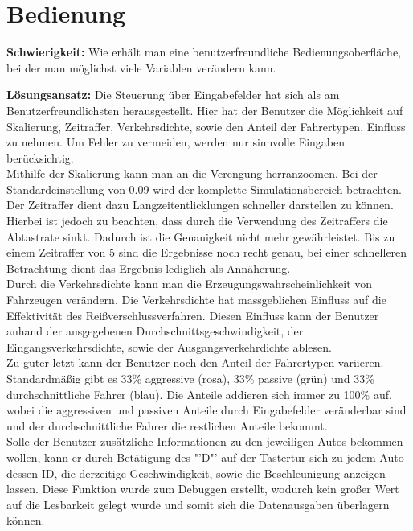 \section{Bedienung}
\textbf{Schwierigkeit:} Wie erhält man eine benutzerfreundliche Bedienungsoberfläche, bei der man möglichst viele Variablen verändern kann.
\begin{addmargin}[25pt]{0pt}
	\item \textbf{Lösungsansatz:} Die Steuerung über Eingabefelder hat sich als am Benutzerfreundlichsten herausgestellt. Hier hat der Benutzer die Möglichkeit auf Skalierung, Zeitraffer, Verkehrsdichte, sowie den Anteil der Fahrertypen, Einfluss zu nehmen. Um Fehler zu vermeiden, werden nur sinnvolle Eingaben berücksichtig.\\ 
	Mithilfe der Skalierung kann man an die Verengung herranzoomen. Bei der Standardeinstellung von 0.09 wird der komplette Simulationsbereich betrachten.\\ 
	Der Zeitraffer dient dazu Langzeitentlicklungen schneller darstellen zu können. Hierbei ist jedoch zu beachten, dass durch die Verwendung des Zeitraffers die Abtastrate sinkt. Dadurch ist die Genauigkeit nicht mehr gewährleistet. Bis zu einem Zeitraffer von 5 sind die Ergebnisse noch recht genau, bei einer schnelleren Betrachtung dient das Ergebnis lediglich als Annäherung.\\
	Durch die Verkehrsdichte kann man die Erzeugungswahrscheinlichkeit von Fahrzeugen verändern. Die Verkehrsdichte hat massgeblichen Einfluss auf die Effektivität des Reißverschlussverfahren. Diesen Einfluss kann der Benutzer anhand der ausgegebenen Durchschnittsgeschwindigkeit, der Eingangsverkehrsdichte, sowie der Ausgangsverkehrdichte ablesen.\\
	Zu guter letzt kann der Benutzer noch den Anteil der Fahrertypen variieren. Standardmäßig gibt es 33\% aggressive (rosa), 33\% passive (grün) und 33\% durchschnittliche Fahrer (blau). Die Anteile addieren sich immer zu 100\% auf, wobei die aggressiven und passiven Anteile durch Eingabefelder veränderbar sind und der durchschnittliche Fahrer die restlichen Anteile bekommt.\\
	Solle der Benutzer zusätzliche Informationen zu den jeweiligen Autos bekommen wollen, kann er durch Betätigung des "'D"' auf der Tastertur sich zu jedem Auto dessen ID, die derzeitige Geschwindigkeit, sowie die Beschleunigung anzeigen lassen. Diese Funktion wurde zum Debuggen erstellt, wodurch kein großer Wert auf die Lesbarkeit gelegt wurde und somit sich die Datenausgaben überlagern können.\\
\end{addmargin}

